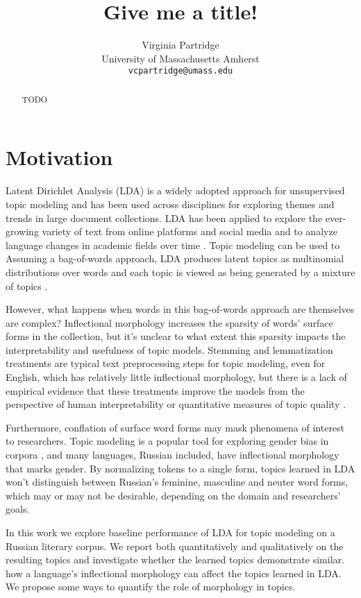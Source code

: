 \documentclass[11pt,a4paper]{article}
\title{Give me a title!}
\author{Virginia Partridge \\
  University of Massachusetts Amherst\\
  \texttt{vcpartridge@umass.edu}
}
\date{}
\begin{document}
\maketitle
\begin{abstract}
TODO
\end{abstract}

\section{Motivation}
Latent Dirichlet Analysis (LDA) is a widely adopted approach for unsupervised topic modeling and has been used across disciplines for exploring themes and trends in large document collections. LDA has been applied to explore the ever-growing variety of text from online platforms and social media and to analyze language changes in academic fields over time \cite{koltsova2013,mcfarland2013differentiating, vogel-jurafsky-2012-said, mitrofanova2015probabilistic}. Topic modeling can be used to
Assuming a bag-of-words approach, LDA produces latent topics as multinomial distributions over words and each topic is viewed as being generated by a mixture of topics \cite{blei2003,steyvers2007probabilistic}.

However, what happens when words in this bag-of-words approach are themselves are complex? Inflectional morphology increases the sparsity of words' surface forms in the collection, but it's unclear to what extent this sparsity impacts the interpretability and usefulness of topic models. Stemming and lemmatization treatments are typical text preprocessing steps for topic modeling, even for English, which has relatively little inflectional morphology, but there is a lack of empirical evidence that these treatments improve the models from the perspective of human interpretability or quantitative measures of topic quality \cite{schofield-mimno-2016-comparing}.

Furthermore, conflation of surface word forms may mask phenomena of interest to researchers. Topic modeling is a popular tool for exploring gender bias in corpora \cite{vogel-jurafsky-2012-said,devinney-etal-2020-semi}, and many languages, Russian included, have inflectional morphology that marks gender. By normalizing tokens to a single form, topics learned in LDA won't distinguish between Russian's feminine, masculine and neuter word forms, which may or may not be desirable, depending on the domain and researchers' goals.

In this work we explore baseline performance of LDA for topic modeling on a Russian literary corpus. We report both quantitatively and qualitatively on the resulting topics and investigate whether the learned topics demonstrate similar.  how a language's inflectional morphology can affect the topics learned in LDA. We propose some ways to quantify the role of morphology in topics.
\end{document}
